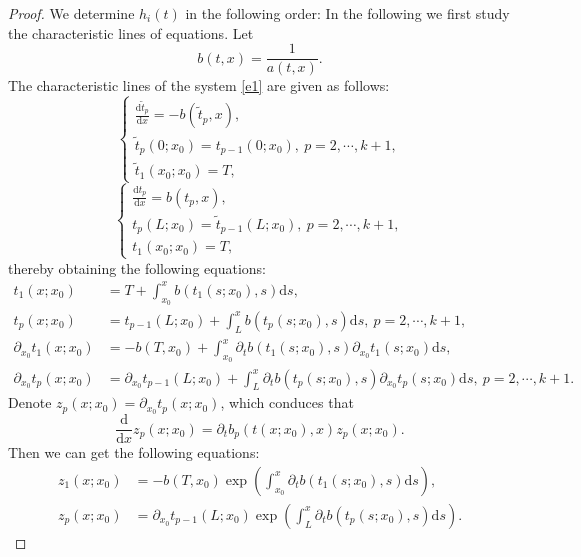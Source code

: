 \documentclass[a4paper,reqno,11pt]{amsart}
\numberwithin{equation}{section} %
\begin{document}
\begin{proof}
We determine $h_i\left( t \right)$ in the following order:
In the following we first study the characteristic lines of equations. Let 
$$
b(t,x)=\frac{1}{a(t,x)}.
$$
The characteristic lines of the system \eqref{e1} are given as follows:
\begin{equation}\label{27}
    \left\{ \begin{array}{l}
        \frac{\text{d}\tilde{t} _p}{\text{d}x}= -b\left( \tilde{t} _p ,x \right), \\
        \tilde{t} _p(0;x_0) = t_{p-1}(0;x_0) ,\ p=2,\cdots ,k+1,\\
        \tilde{t} _1(x_0;x_0) = T,
    \end{array} \right. 
    \end{equation}
\begin{equation}\label{28}
    \left\{ \begin{array}{l}
        \frac{\text{d}t_p}{\text{d}x}= b\left( t_p,x \right) ,\\
        t_p(L;x_0) = \tilde{t} _{p-1}(L;x_0) ,\ p=2,\cdots ,k+1,\\
        t_1(x_0;x_0) = T,
    \end{array} \right. 
\end{equation}
thereby obtaining the following equations:
\begin{equation}\label{time line 1}
\begin{aligned}
	t_1 \left( x;x_0 \right) &=T+\int_{x_0}^x b\left( t_1 \left( s;x_0 \right) ,s \right) \text{d}s ,\\
    t_p \left( x;x_0 \right) &=t_{p-1} \left( L;x_0 \right)+\int_{L}^x b\left( t_p \left( s;x_0 \right) ,s \right) \text{d}s ,\ p=2 , \cdots , k+1 ,\\
	\partial _{x_0}t_1\left( x;x_0 \right) &=-b\left( T,x_0 \right) +\int_{x_0}^x{ \partial _t}b\left( t_1 \left( s;x_0 \right) ,s \right) \partial _{x_0}t_1\left( s;x_0 \right) \text{d}s ,\\
	\partial _{x_0}t_p\left( x;x_0 \right) &=\partial _{x_0} t _{p-1} \left( L;x_0 \right) +\int_{L}^x{ \partial _t}b\left( t_p \left( s;x_0 \right) ,s \right) \partial _{x_0}t_p \left( s;x_0 \right) \text{d}s ,\ p=2 , \cdots , k+1 .
\end{aligned}
\end{equation}
Denote $z_p(x;x_0)=\partial _{x_0}t_p \left( x;x_0 \right)$, which conduces that
$$
\frac{\text{d}}{\text{d}x}z_p \left( x;x_0 \right) = \partial _t b_p \left( t\left( x;x_0 \right) ,x \right) z_p \left( x;x_0 \right) .
$$
Then we can get the following equations:
\begin{equation}\label{time line}
	\begin{aligned}
	z_1 \left( x;x_0 \right) &=-b\left( T,x_0 \right) \exp \left(  \int_{x_0}^x{\partial _t}b\left( t_1 \left( s;x_0 \right) ,s \right) \text{d}s \right), \\
	z_p \left( x;x_0 \right) &=\partial _{x_0} t_{p-1} \left( L;x_0 \right) \exp \left(  \int_{L}^x{\partial _t}b\left( t_p \left( s;x_0 \right) ,s \right) \text{d}s \right).
\end{aligned}
\end{equation}


\end{proof}
\end{document}

